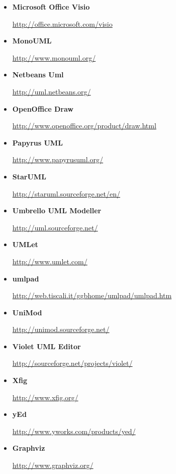 \begin{itemize}
\item {\bf Microsoft Office Visio}
\par \noindent \url{http://office.microsoft.com/visio}

\item {\bf MonoUML}
\par \noindent \url{http://www.monouml.org/}

\item {\bf Netbeans Uml}
\par \noindent \url{http://uml.netbeans.org/}

\item {\bf OpenOffice Draw}
\par \noindent \url{http://www.openoffice.org/product/draw.html}

\item {\bf Papyrus UML}
\par \noindent \url{http://www.papyrusuml.org/}

\item {\bf StarUML}
\par \noindent \url{http://staruml.sourceforge.net/en/}

\item {\bf Umbrello UML Modeller}
\par \noindent \url{http://uml.sourceforge.net/}

\item {\bf UMLet}
\par \noindent \url{http://www.umlet.com/}

\item {\bf umlpad}
\par \noindent \url{http://web.tiscali.it/ggbhome/umlpad/umlpad.htm}

\item {\bf UniMod}
\par \noindent \url{http://unimod.sourceforge.net/}

\item {\bf Violet UML Editor}
\par \noindent \url{http://sourceforge.net/projects/violet/}

\item {\bf Xfig}
\par \noindent \url{http://www.xfig.org/}

\item {\bf yEd}
\par \noindent \url{http://www.yworks.com/products/yed/}

\item {\bf Graphviz}
\par \noindent \url{http://www.graphviz.org/}

\end{itemize}